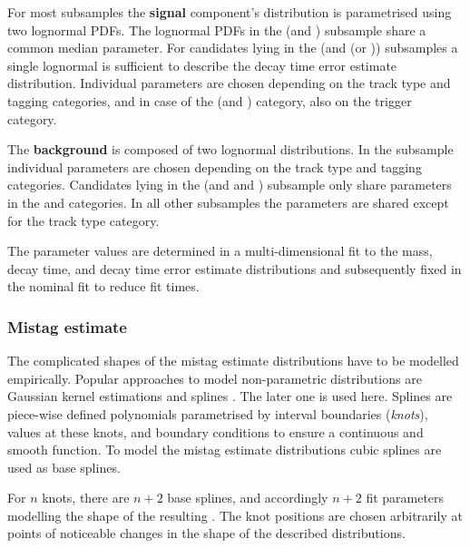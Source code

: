 For most subsamples the \textbf{signal} component's distribution is parametrised
using two lognormal \acp{PDF}. The lognormal \acp{PDF} in the (\catLL and
\catOS) subsample share a common median parameter. For candidates lying in the
(\catLL and (\catSS or \catBS)) subsamples a single lognormal \PDF is sufficient
to describe the decay time error estimate distribution. Individual parameters
are chosen depending on the track type and tagging categories, and in case of
the (\catDD and \catOS) category, also on the trigger category.

The \textbf{background} \PDF is composed of two lognormal distributions. In the
\catLL subsample individual parameters are chosen depending on the track type
and tagging categories. Candidates lying in the (\catDD and \catOS and \catAU)
subsample only share parameters in the \catOO and \catOT categories. In all
other subsamples the parameters are shared except for the track type category.

The parameter values are determined in a multi-dimensional fit to the mass,
decay time, and decay time error estimate distributions and subsequently fixed
in the nominal fit to reduce fit times.

\subsubsection{Mistag estimate}
\label{sec:measurement_of_sin2beta:likelihood_fit:model:mistag}

The complicated shapes of the mistag estimate distributions have to be modelled
empirically. Popular approaches to model non-parametric distributions are \eg
Gaussian kernel estimations and splines \cite{Karbach:2014qba}. The later one is
used here. Splines are piece-wise defined polynomials parametrised by interval
boundaries (\emph{knots}), values at these knots, and boundary conditions to
ensure a continuous and smooth function. To model the mistag estimate
distributions cubic splines are used as base splines.

For $n$ knots, there are $n+2$ base splines, and accordingly $n+2$ fit
parameters modelling the shape of the resulting \PDF. The knot positions are
chosen arbitrarily at points of noticeable changes in the shape of the described
distributions.

